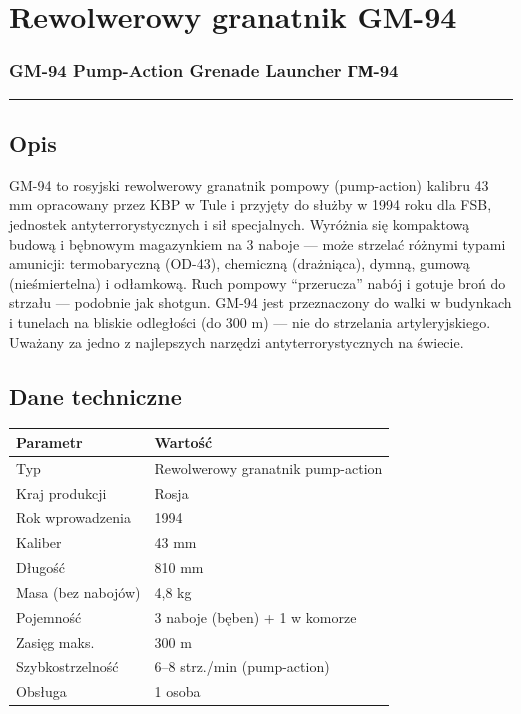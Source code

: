 \documentclass[12pt,openany,oneside]{book}
\begin{document}
\chapter{Rewolwerowy granatnik GM-94}\label{rewolwerowy-granatnik-gm-94}

\subsection{GM-94 Pump-Action Grenade Launcher \textbar{}
ГМ-94}\label{gm-94-pump-action-grenade-launcher-ux433ux43c-94}

\begin{center}\rule{0.5\linewidth}{0.5pt}\end{center}

\section{Opis}\label{opis-85}

GM-94 to rosyjski rewolwerowy granatnik pompowy (pump-action) kalibru 43
mm opracowany przez KBP w Tule i przyjęty do służby w 1994 roku dla FSB,
jednostek antyterrorystycznych i sił specjalnych. Wyróżnia się
kompaktową budową i bębnowym magazynkiem na 3 naboje --- może strzelać
różnymi typami amunicji: termobaryczną (OD-43), chemiczną (drażniąca),
dymną, gumową (nieśmiertelna) i odłamkową. Ruch pompowy ``przerucza''
nabój i gotuje broń do strzału --- podobnie jak shotgun. GM-94 jest
przeznaczony do walki w budynkach i tunelach na bliskie odległości (do
300 m) --- nie do strzelania artyleryjskiego. Uważany za jedno z
najlepszych narzędzi antyterrorystycznych na świecie.

\section{Dane techniczne}\label{dane-techniczne-85}

\begin{longtable}[]{@{}ll@{}}
\toprule\noalign{}
Parametr & Wartość \\
\midrule\noalign{}
\endhead
\bottomrule\noalign{}
\endlastfoot
Typ & Rewolwerowy granatnik pump-action \\
Kraj produkcji & Rosja \\
Rok wprowadzenia & 1994 \\
Kaliber & 43 mm \\
Długość & 810 mm \\
Masa (bez nabojów) & 4,8 kg \\
Pojemność & 3 naboje (bęben) + 1 w komorze \\
Zasięg maks. & 300 m \\
Szybkostrzelność & 6--8 strz./min (pump-action) \\
Obsługa & 1 osoba \\
\end{longtable}
\end{document}
